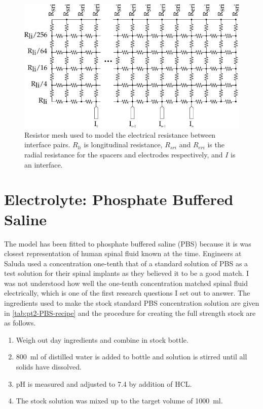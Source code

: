     \begin{figure}
      \centering
      \includegraphics{content/pt2/07-InterfaceModel/graphics/resistorMesh}
      \caption{\label{fig:pt2-ResistorMesh}Resistor mesh used to model the electrical resistance between interface pairs. $R_{li}$ is longitudinal resistance, $R_{sri}$ and $R_{eri}$ is the radial resistance for the spacers and electrodes respectively, and $I$ is an interface.}
    \end{figure}

\section{Electrolyte: Phosphate Buffered Saline}
  The model has been fitted to phosphate buffered saline (PBS) because it is was closest representation of human spinal fluid known at the time.
  Engineers at Saluda used a concentration one-tenth that of a standard solution of PBS as a test solution for their spinal implants as they believed it to be a good match.
  I was not understood how well the one-tenth concentration matched spinal fluid electrically, which is one of the first research questions I set out to answer.
  The ingredients used to make the stock standard PBS concentration solution are given in \cref{tab:pt2-PBS-recipe} and the procedure for creating the full strength stock are as follows.
  \begin{enumerate}
    \item Weigh out day ingredients and combine in stock bottle.
    \item \SI{800}{\milli\litre} of distilled water is added to bottle and solution is stirred until all solids have dissolved.
    \item pH is measured and adjusted to 7.4 by addition of HCL.
    \item The stock solution was mixed up to the target volume of \SI{1000}{\milli\litre}.
  \end{enumerate}

